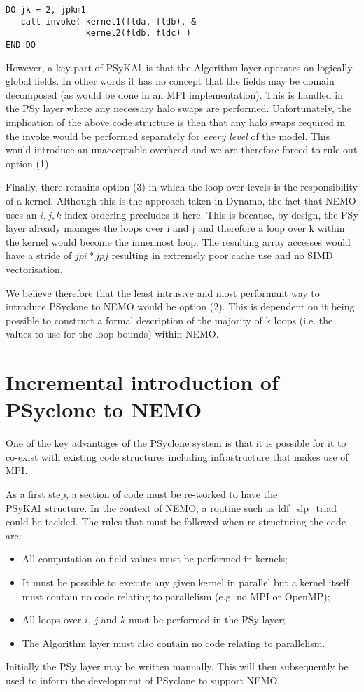 \documentclass{article}
\newcommand{\psykal}{{PS}y{KA}l}
\begin{document}
\begin{verbatim}
DO jk = 2, jpkm1
   call invoke( kernel1(flda, fldb), &
                kernel2(fldb, fldc) )
END DO
\end{verbatim}

However, a key part of \psykal\ is that the Algorithm layer operates on
logically global fields. In other words it has no concept that the
fields may be domain decomposed (as would be done in an MPI
implementation). This is handled in the PSy layer where any necessary
halo swaps are performed. Unfortunately, the implication of the above
code structure is then that any halo swaps required in the invoke
would be performed separately for \emph{every level} of the
model. This would introduce an unacceptable overhead and we are
therefore forced to rule out option (1).

Finally, there remains option (3) in which the loop over levels is the
responsibility of a kernel. Although this is the approach taken in
Dynamo, the fact that NEMO uses an $i,j,k$ index ordering precludes it
here. This is because, by design, the PSy layer already manages the
loops over i and j and therefore a loop over k within the kernel would
become the innermost loop. The resulting array accesses would have a
stride of $jpi*jpj$ resulting in extremely poor cache use and no SIMD
vectorisation.

We believe therefore that the least intrusive and most performant way
to introduce PSyclone to NEMO would be option (2). This is dependent
on it being possible to construct a formal description of the majority
of k loops (i.e. the values to use for the loop bounds) within NEMO.

\section{Incremental introduction of PSyclone to NEMO}

One of the key advantages of the PSyclone system is that it is
possible for it to co-exist with existing code structures including
infrastructure that makes use of MPI.

As a first step, a section of code must be re-worked to have the
\psykal\ structure. In the context of NEMO, a routine such as
ldf\_slp\_triad could be tackled. The rules that must be followed when
re-structuring the code are:
\begin{itemize}
\item All computation on field values must be performed in kernels;
\item It must be possible to execute any given kernel in parallel but
  a kernel itself must contain no code relating to parallelism
  (e.g. no MPI or OpenMP);
\item All loops over $i$, $j$ and $k$ must be performed in the PSy
  layer;
\item The Algorithm layer must also contain no code relating to
  parallelism.
\end{itemize}
Initially the PSy layer may be written manually. This will then
subsequently be used to inform the development of PSyclone to support
NEMO.
\end{document}
